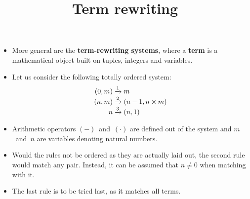 \documentclass[wide]{slides}
\begin{document}
\begin{slide}
  \title{Term rewriting}

  \begin{itemize}

    \item More general are the \textbf{term\hyp{}rewriting systems},
      where a \textbf{term} is a mathematical object built on tuples,
      integers and variables.

    \item Let us consider the following totally ordered system:
      \begin{align*}
        (0,m) &\xrightarrow{1} m\\
        (n,m) &\xrightarrow{\smash 2} (n-1, n \times m)\\
        n     &\xrightarrow{\smash 3} (n,1)
      \end{align*}

      \item Arithmetic operators \((-)\)~and~\((\cdot)\) are defined
        out of the system and \(m\)~and~\(n\) are variables denoting
        natural numbers.

      \item Would the rules not be ordered as they are
        actually laid out, the second rule would match any
        pair. Instead, it can be assumed that \(n \neq 0\) when
        matching with it.

      \item The last rule is to be tried last, as it matches all
        terms.

  \end{itemize}
\end{slide}
\end{document}
